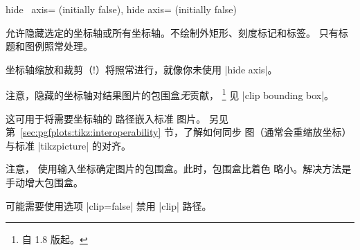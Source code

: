 \begin{pgfplotsxykeylist}{%
    hide \x\ axis= (initially false),
    hide axis= (initially false)%
}

    允许隐藏选定的坐标轴或所有坐标轴。不绘制外矩形、刻度标记和标签。
    只有标题和图例照常处理。

    坐标轴缩放和裁剪（!）将照常进行，就像你未使用 |hide axis|。
\begin{codeexample}[]
\end{codeexample}

\begin{codeexample}[]
\end{codeexample}

    注意，隐藏的坐标轴对结果图片的包围盒\emph{无}贡献，
    \footnote{自 1.8 版起。} 见 |clip bounding box|。
\pgfplotsexpensiveexample
\begin{codeexample}[]
\end{codeexample}
    这可用于将需要坐标轴的 \PGFPlots{} 路径嵌入标准 \tikzname{} 图片。
    另见第~\ref{sec:pgfplots:tikz:interoperability} 节，了解如何同步
    \PGFPlots{} 图（通常会重缩放坐标）与标准 |tikzpicture| 的对齐。

    注意，\PGFPlots{} 使用输入坐标确定图片的包围盒。此时，包围盒比着色
    略小。解决方法是手动增大包围盒。

    可能需要使用选项 |clip=false| 禁用 |clip| 路径。
\end{pgfplotsxykeylist}


